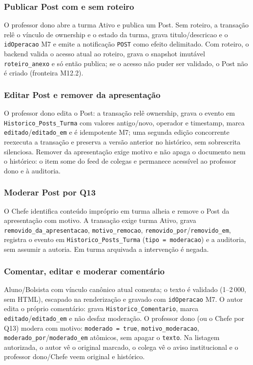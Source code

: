\subsubsection{Publicar Post com e sem roteiro}
O professor dono abre a turma Ativo e publica um Post. Sem roteiro, a transação
relê o vínculo de ownership e o estado da turma, grava titulo/descricao e o
\texttt{idOperacao} M7 e emite a notificação \texttt{POST} como efeito
delimitado. Com roteiro, o backend valida o acesso atual ao roteiro, grava o
snapshot imutável \texttt{roteiro\_anexo} e só então publica; se o acesso não
puder ser validado, o Post não é criado (fronteira M12.2).

\subsubsection{Editar Post e remover da apresentação}
O professor dono edita o Post: a transação relê ownership, grava o evento em
\texttt{Historico\_Posts\_Turma} com valores antigo/novo, operador e timestamp,
marca \texttt{editado}/\texttt{editado\_em} e é idempotente M7; uma segunda
edição concorrente reexecuta a transação e preserva a versão anterior no
histórico, sem sobrescrita silenciosa. Remover da apresentação exige motivo e
não apaga o documento nem o histórico: o item some do feed de colegas e
permanece acessível ao professor dono e à auditoria.

\subsubsection{Moderar Post por Q13}
O Chefe identifica conteúdo impróprio em turma alheia e remove o Post da
apresentação com motivo. A transação exige turma Ativo, grava
\texttt{removido\_da\_apresentacao}, \texttt{motivo\_remocao},
\texttt{removido\_por}/\texttt{removido\_em}, registra o evento em
\texttt{Historico\_Posts\_Turma} (\texttt{tipo = moderacao}) e a auditoria,
sem assumir a autoria. Em turma arquivada a intervenção é negada.

\subsubsection{Comentar, editar e moderar comentário}
Aluno/Bolsista com vínculo canônico atual comenta; o texto é validado (1--2\,000,
sem HTML), escapado na renderização e gravado com \texttt{idOperacao} M7. O
autor edita o próprio comentário: grava \texttt{Historico\_Comentario},
marca \texttt{editado}/\texttt{editado\_em} e não desfaz moderação. O professor
dono (ou o Chefe por Q13) modera com motivo: \texttt{moderado = true},
\texttt{motivo\_moderacao}, \texttt{moderado\_por}/\texttt{moderado\_em}
atômicos, sem apagar o \texttt{texto}. Na listagem autorizada, o autor vê o
original marcado, o colega vê o aviso institucional e o professor dono/Chefe
veem original e histórico.

